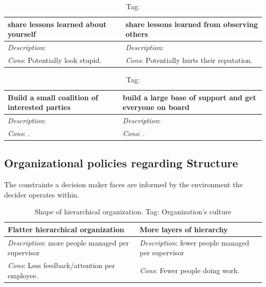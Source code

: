 \begin{center}
\begin{table}[ht]
\begin{tabular}{ | m{\dilemmatablewidth}| m{\dilemmatablewidth} | } 
  \hline
  \textbf{share lessons learned about yourself} & 
  \textbf{share lessons learned from observing others  } \\ 
  \hline
  \textit{Description}:  & 
  \textit{Description}:  \\ 
  \hline
  \textit{Cons}: Potentially look stupid. & 
  \textit{Cons}: Potentially hurts their reputation. \\  
  \hline
\end{tabular}
\caption{
{\tiny Tag: }
}
\label{table:share_lessons_learned}
\end{table}
\end{center}


\begin{center}
\begin{table}[ht]
\begin{tabular}{ | m{\dilemmatablewidth}| m{\dilemmatablewidth} | } 
  \hline
  \textbf{Build a small coalition of interested parties} & 
  \textbf{build a large base of support and get everyone on board} \\ 
  \hline
  \textit{Description}:  & 
  \textit{Description}:  \\ 
  \hline
  \textit{Cons}: . & 
  \textit{Cons}: . \\  
  \hline
\end{tabular}
\caption{
{\tiny Tag: }
}
\label{table:how_to_change}
\end{table}
\end{center}

\subsection{Organizational policies regarding Structure}

The constraints a decision maker faces are informed by the environment the decider operates within. 

\begin{center}
\begin{table}[ht]
\begin{tabular}{ | m{\dilemmatablewidth}| m{\dilemmatablewidth} | } 
  \hline
  \textbf{Flatter hierarchical organization} &
  \textbf{More layers of hierarchy} \\ 
  \hline
  \textit{Description}: more people managed per supervisor & 
  \textit{Description}: fewer people managed per supervisor \\ 
  \hline
  \textit{Cons}: Less feedback/attention per employee. & 
  \textit{Cons}: Fewer people doing work. \\  
  \hline
\end{tabular}
\caption{Shape of hierarchical organization.
{\tiny Tag: Organization's culture}
}
\end{table}
\end{center}

